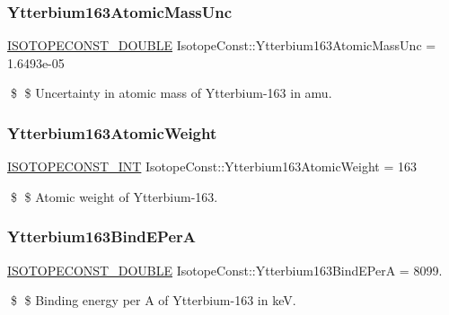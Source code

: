 \subsubsection{\texorpdfstring{Ytterbium163\+Atomic\+Mass\+Unc}{Ytterbium163AtomicMassUnc}}
{\footnotesize\ttfamily \mbox{\hyperlink{group___isotope_const-_macros_ga8f45a7272ce02c0b4c65c44636ed719a}{I\+S\+O\+T\+O\+P\+E\+C\+O\+N\+S\+T\+\_\+\+D\+O\+U\+B\+LE}} Isotope\+Const\+::\+Ytterbium163\+Atomic\+Mass\+Unc = 1.\+6493e-\/05}

\$ \$ Uncertainty in atomic mass of Ytterbium-\/163 in amu. \mbox{\label{group___isotope_const-_ytterbium-_yb163_ga7738711f28a15a1e18b11faabe33f245}} 
\subsubsection{\texorpdfstring{Ytterbium163\+Atomic\+Weight}{Ytterbium163AtomicWeight}}
{\footnotesize\ttfamily \mbox{\hyperlink{group___isotope_const-_macros_ga5f18360b3e99483a35c32d789e62621c}{I\+S\+O\+T\+O\+P\+E\+C\+O\+N\+S\+T\+\_\+\+I\+NT}} Isotope\+Const\+::\+Ytterbium163\+Atomic\+Weight = 163}

\$ \$ Atomic weight of Ytterbium-\/163. \mbox{\label{group___isotope_const-_ytterbium-_yb163_ga8fb1c88944357a13ea9d899a9ac6424c}} 
\subsubsection{\texorpdfstring{Ytterbium163\+Bind\+E\+PerA}{Ytterbium163BindEPerA}}
{\footnotesize\ttfamily \mbox{\hyperlink{group___isotope_const-_macros_ga8f45a7272ce02c0b4c65c44636ed719a}{I\+S\+O\+T\+O\+P\+E\+C\+O\+N\+S\+T\+\_\+\+D\+O\+U\+B\+LE}} Isotope\+Const\+::\+Ytterbium163\+Bind\+E\+PerA = 8099.}

\$ \$ Binding energy per A of Ytterbium-\/163 in keV. \mbox{\label{group___isotope_const-_ytterbium-_yb163_ga577df9d63a0267cc5695963598622354}} 
